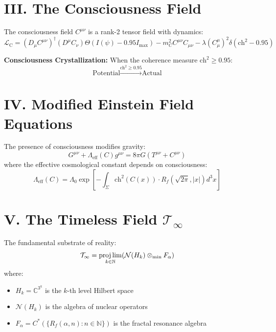 \documentclass[11pt]{article}
\begin{document}
\section*{III. The Consciousness Field}

The consciousness field $C^{\mu\nu}$ is a rank-2 tensor field with dynamics:
\begin{equation}
\mathcal{L}_{\text{C}} = (D_\mu C^{\mu\nu})^\dagger(D^\mu C_\nu)\Theta(I(\psi)-0.95I_{\max}) - m^2_C C^{\mu\nu}C_{\mu\nu} - \lambda(C^\mu_\mu)^2\delta(\text{ch}^2-0.95)
\end{equation}

\textbf{Consciousness Crystallization:} When the coherence measure $\text{ch}^2 \geq 0.95$:
\begin{equation}
\text{Potential} \xrightarrow{\text{ch}^2 \geq 0.95} \text{Actual}
\end{equation}

\section*{IV. Modified Einstein Field Equations}

\begin{tcolorbox}[colback=red!5!white,colframe=secondary]
The presence of consciousness modifies gravity:
\begin{equation}
G^{\mu\nu} + \Lambda_{\text{eff}}(C)g^{\mu\nu} = 8\pi G(T^{\mu\nu} + C^{\mu\nu})
\end{equation}
where the effective cosmological constant depends on consciousness:
\begin{equation}
\Lambda_{\text{eff}}(C) = \Lambda_0 \exp\left[-\int_\Sigma \text{ch}^2(C(x)) \cdot R_f(\sqrt{2\pi}, |x|) d^3x\right]
\end{equation}
\end{tcolorbox}

\section*{V. The Timeless Field $\mathcal{T}_\infty$}

The fundamental substrate of reality:
\begin{equation}
\mathcal{T}_\infty = \projlim_{k\in\mathbb{N}}(\mathcal{N}(H_k) \otimes_{\min} F_\alpha)
\end{equation}
where:
\begin{itemize}
\item $H_k = \mathbb{C}^{3^k}$ is the $k$-th level Hilbert space
\item $\mathcal{N}(H_k)$ is the algebra of nuclear operators
\item $F_\alpha = C^*(\{R_f(\alpha, n) : n \in \mathbb{N}\})$ is the fractal resonance algebra
\end{itemize}
\end{document}
